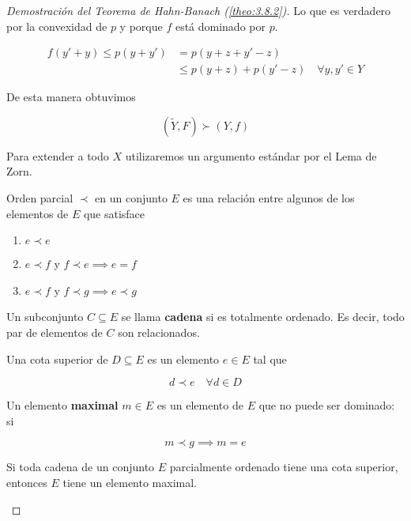 \begin{proof}[Demostración del Teorema de Hahn-Banach (\ref{theo:3.8.2})]
    Lo que es verdadero por la convexidad de $p$ y porque $f$ está dominado por $p$.

    \begin{align*}
        f(y'+y)\leq p(y+y')&=p(y+z+y'-z)\\
        &\leq p(y+z)+p(y'-z)\quad\forall y,y'\in Y
    \end{align*}

    De esta manera obtuvimos 

    \[(\tilde Y,F)\succ (Y,f)\]

    Para extender a todo $X$ utilizaremos un argumento estándar por el Lema de Zorn. 

    \begin{fdefinition}
        Orden parcial $\prec$ en un conjunto $E$ es una relación entre algunos de los elementos de $E$ que satisface

        \begin{enumerate}
            \item $e\prec e$
            \item $e\prec f$ y $f\prec e\implies e=f$
            \item $e\prec f$ y $f\prec g\implies e\prec g$
        \end{enumerate}
    \end{fdefinition}

    \begin{fdefinition}
        Un subconjunto $C\subseteq E$ se llama \textbf{cadena} si es totalmente ordenado. Es decir, todo par de elementos de $C$ son relacionados.
    \end{fdefinition}

    \begin{fdefinition}
        Una cota superior de $D\subseteq E$ es un elemento $e\in E$ tal que 

        \[d\prec e\quad\forall d\in D\]
    \end{fdefinition}

    \begin{fdefinition}
        Un elemento \textbf{maximal} $m\in E$ es un elemento de $E$ que no puede ser dominado: si 

        \[m\prec g\implies m=e\]
    \end{fdefinition}

    \begin{flemma}
        Si toda cadena de un conjunto $E$ parcialmente ordenado tiene una cota superior, entonces $E$ tiene un elemento maximal.
    \end{flemma}


\end{proof}
